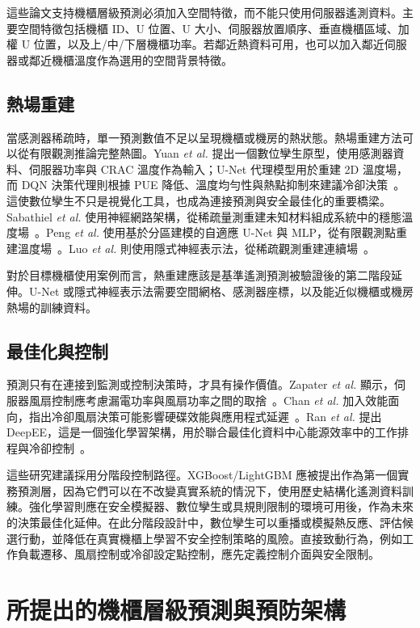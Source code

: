 \documentclass[12pt,a4paper]{article}
\newcommand{\etal}{\textit{et al.}}
\begin{document}
這些論文支持機櫃層級預測必須加入空間特徵，而不能只使用伺服器遙測資料。主要空間特徵包括機櫃 ID、U 位置、U 大小、伺服器放置順序、垂直機櫃區域、加權 U 位置，以及上/中/下層機櫃功率。若鄰近熱資料可用，也可以加入鄰近伺服器或鄰近機櫃溫度作為選用的空間背景特徵。

\subsection{熱場重建}

當感測器稀疏時，單一預測數值不足以呈現機櫃或機房的熱狀態。熱場重建方法可以從有限觀測推論完整熱圖。Yuan \etal{} 提出一個數位孿生原型，使用感測器資料、伺服器功率與 CRAC 溫度作為輸入；U-Net 代理模型用於重建 2D 溫度場，而 DQN 決策代理則根據 PUE 降低、溫度均勻性與熱點抑制來建議冷卻決策~\cite{yuan_2025}。這使數位孿生不只是視覺化工具，也成為連接預測與安全最佳化的重要橋梁。Sabathiel \etal{} 使用神經網路架構，從稀疏量測重建未知材料組成系統中的穩態溫度場~\cite{sabathiel_2024}。Peng \etal{} 使用基於分區建模的自適應 U-Net 與 MLP，從有限觀測點重建溫度場~\cite{peng_2022}。Luo \etal{} 則使用隱式神經表示法，從稀疏觀測重建連續場~\cite{luo_2024}。

對於目標機櫃使用案例而言，熱重建應該是基準遙測預測被驗證後的第二階段延伸。U-Net 或隱式神經表示法需要空間網格、感測器座標，以及能近似機櫃或機房熱場的訓練資料。

\subsection{最佳化與控制}

預測只有在連接到監測或控制決策時，才具有操作價值。Zapater \etal{} 顯示，伺服器風扇控制應考慮漏電功率與風扇功率之間的取捨~\cite{zapater_2015}。Chan \etal{} 加入效能面向，指出冷卻風扇決策可能影響硬碟效能與應用程式延遲~\cite{chan_2019}。Ran \etal{} 提出 DeepEE，這是一個強化學習架構，用於聯合最佳化資料中心能源效率中的工作排程與冷卻控制~\cite{ran_2019}。

這些研究建議採用分階段控制路徑。XGBoost/LightGBM 應被提出作為第一個實務預測層，因為它們可以在不改變真實系統的情況下，使用歷史結構化遙測資料訓練。強化學習則應在安全模擬器、數位孿生或具規則限制的環境可用後，作為未來的決策最佳化延伸。在此分階段設計中，數位孿生可以重播或模擬熱反應、評估候選行動，並降低在真實機櫃上學習不安全控制策略的風險。直接致動行為，例如工作負載遷移、風扇控制或冷卻設定點控制，應先定義控制介面與安全限制。

\newpage
\section{所提出的機櫃層級預測與預防架構}
\end{document}
